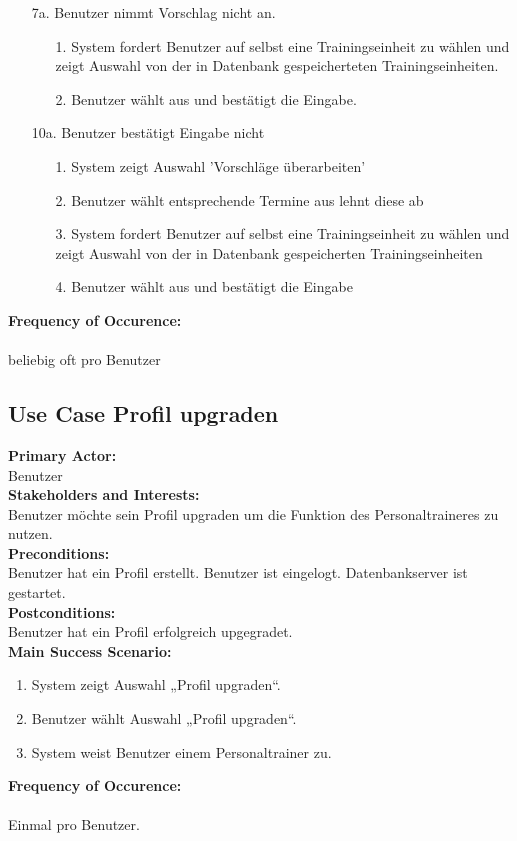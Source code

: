 \documentclass[12pt,a4paper,onecolumn]{article}
\begin{document}
\begin{enumerate}
    \item [7a.]  Benutzer nimmt Vorschlag nicht an.
    \begin{enumerate}
        \item[1.]System fordert Benutzer auf selbst eine Trainingseinheit zu wählen und zeigt Auswahl von der in Datenbank gespeicherteten Trainingseinheiten.
        \item[2.]Benutzer wählt aus und bestätigt die Eingabe.
    \end{enumerate}
    \item [10a.] Benutzer bestätigt Eingabe nicht
     \begin{enumerate}
        \item[1.]System zeigt Auswahl 'Vorschläge überarbeiten'
        \item[2.]Benutzer wählt entsprechende Termine aus lehnt diese ab
        \item[3.]System fordert Benutzer auf selbst eine Trainingseinheit zu wählen und zeigt Auswahl von der in Datenbank gespeicherten Trainingseinheiten
        \item[4.]Benutzer wählt aus und bestätigt die Eingabe
    \end{enumerate}
\end{enumerate}
\textbf{Frequency of Occurence:}\\ \\
beliebig oft pro Benutzer

\subsection{Use Case Profil upgraden}
\textbf{Primary Actor:}\\ Benutzer\\
\textbf{Stakeholders and Interests:}\\
Benutzer möchte sein Profil upgraden um die Funktion des Personaltraineres zu nutzen.\\
\textbf{Preconditions:} \\ Benutzer hat ein Profil erstellt. 
Benutzer ist eingelogt. Datenbankserver ist gestartet.\\
\textbf{Postconditions:}\\Benutzer hat ein Profil erfolgreich upgegradet.\\
\textbf{Main Success Scenario:}
\begin{enumerate}
    \item System zeigt Auswahl „Profil upgraden“.
    \item Benutzer wählt Auswahl „Profil upgraden“.
    \item System weist Benutzer einem Personaltrainer zu.
\end{enumerate}
\textbf{Frequency of Occurence:}\\ \\
Einmal pro Benutzer.
\end{document}
